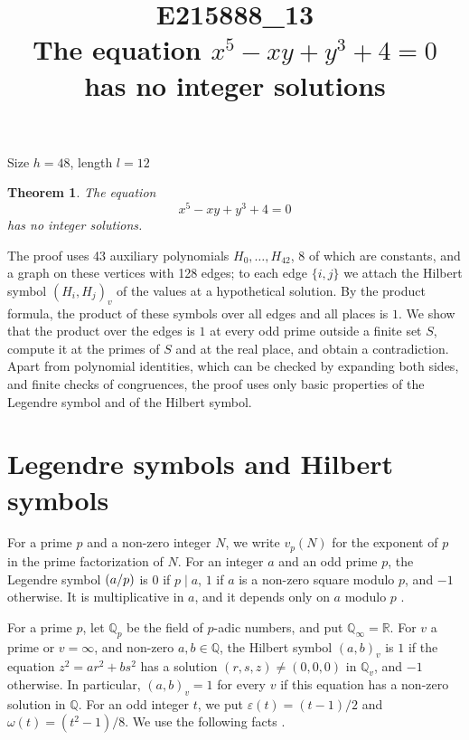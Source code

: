 \documentclass[11pt]{article}
\title{\textbf{E215888\_13}\\[4pt] {\Large The equation $x^{5}-xy+y^{3}+4=0$ has no integer solutions}}
\author{}
\date{}
\newtheorem{theorem}{Theorem}
\newcommand{\Q}{\mathbb{Q}}
\newcommand{\leg}[2]{\mathchoice{\biggl(\dfrac{#1}{#2}\biggr)}{(#1/#2)}{(#1/#2)}{(#1/#2)}}
\begin{document}
\maketitle
\vspace{-8ex}
\begin{center}
Size $h=48$, length $l=12$
\end{center}

\begin{theorem}\label{thm:main}
The equation
\begin{equation}\label{eq:main}
x^{5}-xy+y^{3}+4=0
\end{equation}
has no integer solutions.
\end{theorem}

The proof uses 43 auxiliary polynomials $H_0,\dots,H_{42}$, 8 of which are constants, and a graph on these vertices with 128 edges; to each edge $\{i,j\}$ we attach the Hilbert symbol $(H_i,H_j)_v$ of the values at a hypothetical solution. By the product formula, the product of these symbols over all edges and all places is $1$. We show that the product over the edges is $1$ at every odd prime outside a finite set $S$, compute it at the primes of $S$ and at the real place, and obtain a contradiction. Apart from polynomial identities, which can be checked by expanding both sides, and finite checks of congruences, the proof uses only basic properties of the Legendre symbol and of the Hilbert symbol.

\section{Legendre symbols and Hilbert symbols}

For a prime $p$ and a non-zero integer $N$, we write $v_p(N)$ for the exponent of $p$ in the prime factorization of $N$. For an integer $a$ and an odd prime $p$, the Legendre symbol $\leg{a}{p}$ is $0$ if $p\mid a$, $1$ if $a$ is a non-zero square modulo $p$, and $-1$ otherwise. It is multiplicative in $a$, and it depends only on $a$ modulo $p$ \cite[Chapter~5]{IR}.

For a prime $p$, let $\Q_p$ be the field of $p$-adic numbers, and put $\Q_\infty=\mathbb R$. For $v$ a prime or $v=\infty$, and non-zero $a,b\in\Q$, the Hilbert symbol $(a,b)_v$ is $1$ if the equation $z^2=ar^2+bs^2$ has a solution $(r,s,z)\neq(0,0,0)$ in $\Q_v$, and $-1$ otherwise. In particular, $(a,b)_v=1$ for every $v$ if this equation has a non-zero solution in $\Q$. For an odd integer $t$, we put $\varepsilon(t)=(t-1)/2$ and $\omega(t)=(t^2-1)/8$. We use the following facts \cite[Chapter~III, Proposition~2 and Theorems~1 and~3]{Se}.
\end{document}
